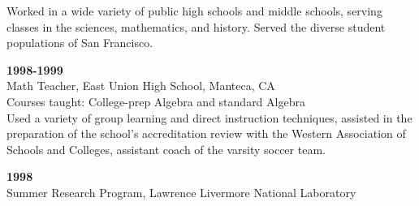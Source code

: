 \documentclass[letterpaper]{article}
\def\footerlink{}
\renewenvironment{itemize}{
  \begin{list}{}{
    \setlength{\leftmargin}{1.5em}
  }
}{
  \end{list}
}
\begin{document}
\begin{itemize}
	Worked in a wide variety of public high schools and middle schools, serving classes in the sciences, mathematics, and history.  Served the diverse student populations of San Francisco.  
	\item \textbf{1998-1999} \\
	Math Teacher, East Union High School, Manteca, CA \\  
	Courses taught: College-prep Algebra and standard Algebra \\  
	Used a variety of group learning and direct instruction techniques, assisted in the preparation of the school's accreditation review with the Western Association of Schools and Colleges, assistant coach of the varsity soccer team.  
	\item \textbf{1998} \\
	Summer Research Program, Lawrence Livermore National Laboratory \\
\end{itemize}

\bigskip

\end{document}
